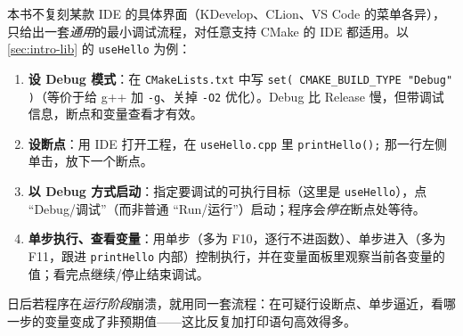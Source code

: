 \begin{practice}\label{prac:intro-debug}
本书不复刻某款 IDE 的具体界面（KDevelop、CLion、VS Code 的菜单各异），只给出一套\emph{通用}的最小调试流程，对任意支持 CMake 的 IDE 都适用\cite{gaoxiang2019slam14}。以 \cref{sec:intro-lib} 的 \texttt{useHello} 为例：
\begin{enumerate}
  \item \textbf{设 Debug 模式}：在 \texttt{CMakeLists.\allowbreak txt} 中写 \texttt{set( CMAKE\_BUILD\_TYPE "Debug" )}（等价于给 g++ 加 \texttt{-g}、关掉 \texttt{-O2} 优化）。Debug 比 Release 慢，但带调试信息，断点和变量查看才有效。
  \item \textbf{设断点}：用 IDE 打开工程，在 \texttt{useHello.\allowbreak cpp} 里 \texttt{printHello();} 那一行左侧单击，放下一个断点。
  \item \textbf{以 Debug 方式启动}：指定要调试的可执行目标（这里是 \texttt{useHello}），点 “Debug/调试”（而非普通 “Run/运行”）启动；程序会\emph{停在}断点处等待。
  \item \textbf{单步执行、查看变量}：用单步（多为 F10，逐行不进函数）、单步进入（多为 F11，跟进 \texttt{printHello} 内部）控制执行，并在变量面板里观察当前各变量的值；看完点继续/停止结束调试。
\end{enumerate}
日后若程序在\emph{运行阶段}崩溃，就用同一套流程：在可疑行设断点、单步逼近，看哪一步的变量变成了非预期值——这比反复加打印语句高效得多。
\end{practice}

